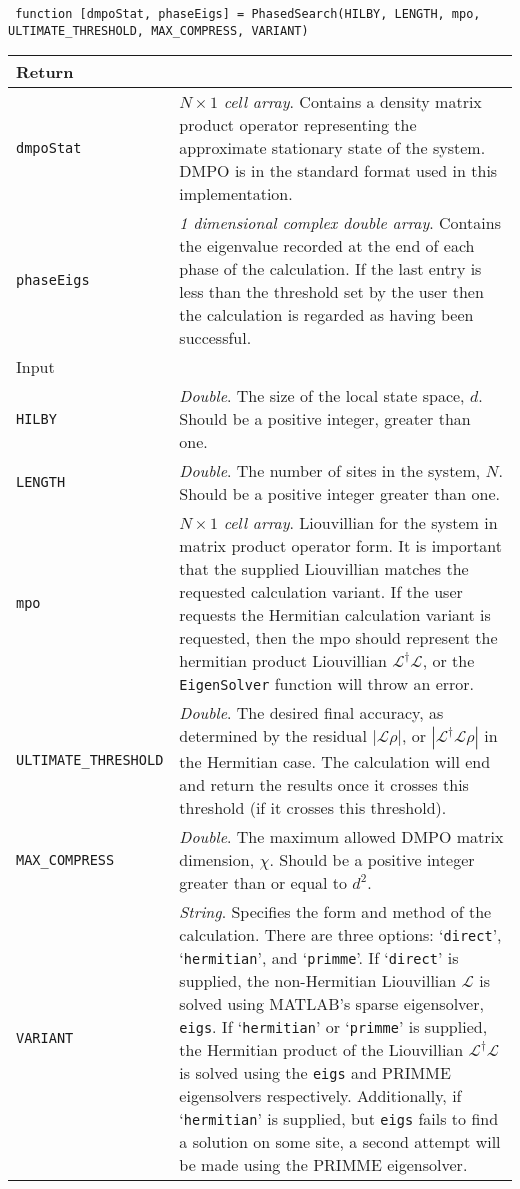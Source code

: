  \begin{lstlisting}
 function [dmpoStat, phaseEigs] = PhasedSearch(HILBY, LENGTH, mpo, ULTIMATE_THRESHOLD, MAX_COMPRESS, VARIANT) \end{lstlisting} 
 \begin{longtabu}{X[1,1]X[4,1]}
 \hline
 Return & \\ \hline
 \lstinline$dmpoStat$ & \emph{\(N \times 1\) cell array}. Contains a density matrix product operator representing the approximate stationary state of the system. DMPO is in the standard format used in this implementation. \\
 \lstinline$phaseEigs$ & \emph{1 dimensional complex double array}. Contains the eigenvalue recorded at the end of each phase of the calculation. If the last entry is less than the threshold set by the user then the calculation is regarded as having been successful. \\ \hline
 Input & \\ \hline
 \lstinline$HILBY$ & \emph{Double}. The size of the local state space, \(d\). Should be a positive integer, greater than one. \\
 \lstinline$LENGTH$ & \emph{Double}. The number of sites in the system, \(N\). Should be a positive integer greater than one. \\
 \lstinline$mpo$ & \emph{\(N \times 1\) cell array}. Liouvillian for the system in matrix product operator form. It is important that the supplied Liouvillian matches the requested calculation variant. If the user requests the Hermitian calculation variant is requested, then the mpo should represent the hermitian product Liouvillian \(\mathcal{L}^{\dagger}\mathcal{L}\), or the \lstinline$EigenSolver$ function will throw an error. \\
 \lstinline$ULTIMATE_THRESHOLD$ & \emph{Double}. The desired final accuracy, as determined by the residual \(|\mathcal{L}\rho|\), or \(|\mathcal{L}^{\dagger}\mathcal{L}\rho|\) in the Hermitian case. The calculation will end and return the results once it crosses this threshold (if it crosses this threshold). \\
 \lstinline$MAX_COMPRESS$ & \emph{Double}. The maximum allowed DMPO matrix dimension, \(\chi\). Should be a positive integer greater than or equal to \(d^{2}\). \\
 \lstinline$VARIANT$ & \emph{String}. Specifies the form and method of the calculation. There are three options: `\lstinline$direct$', `\lstinline$hermitian$', and `\lstinline$primme$'. If `\lstinline$direct$' is supplied, the non-Hermitian Liouvillian \(\mathcal{L}\) is solved using MATLAB's sparse eigensolver, \lstinline$eigs$. If `\lstinline$hermitian$' or `\lstinline$primme$' is supplied, the Hermitian product of the Liouvillian \(\mathcal{L}^{\dagger}\mathcal{L}\) is solved using the \lstinline$eigs$ and PRIMME eigensolvers respectively. Additionally, if `\lstinline$hermitian$' is supplied, but \lstinline$eigs$ fails to find a solution on some site, a second attempt will be made using the PRIMME eigensolver. \\
 \hline 
 \end{longtabu}
